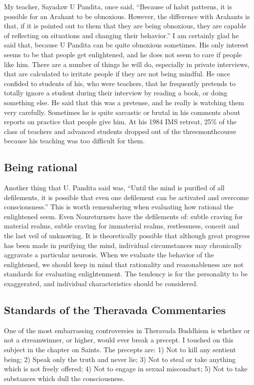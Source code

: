 \documentclass[a5paper,10pt,english]{book}
\begin{document}
\sphinxAtStartPar
My teacher, Sayadaw U Pandita, once said, “Because of habit patterns, it
is possible for an Arahant to be obnoxious. However, the difference with
Arahants is that, if it is pointed out to them that they are being
obnoxious, they are capable of reflecting on situations and changing
their behavior.” I am certainly glad he said that, because U Pandita can
be quite obnoxious sometimes. His only interest seems to be that people
get enlightened, and he does not seem to care if people like him. There
are a number of things he will do, especially in private interviews,
that are calculated to irritate people if they are not being mindful. He
once confided to students of his, who were teachers, that he frequently
pretends to totally ignore a student during their interview by reading a
book, or doing something else. He said that this was a pretense, and he
really is watching them very carefully. Sometimes he is quite sarcastic
or brutal in his comments about reports on practice that people give
him. At his 1984 IMS retreat, 25\% of the class of teachers and advanced
students dropped out of the three\sphinxhyphen{}month\sphinxhyphen{}course because his teaching was
too difficult for them.


\subsection{Being rational}
\label{\detokenize{saints:being-rational}}
\sphinxAtStartPar
Another thing that U. Pandita said was, “Until the mind is purified of
all defilements, it is possible that even one defilement can be
activated and overcome consciousness.” This is worth remembering when
evaluating how rational the enlightened seem. Even Non\sphinxhyphen{}returners have
the defilements of: subtle craving for material realms, subtle craving
for immaterial realms, restlessness, conceit and the last veil of
unknowing. It is theoretically possible that although great progress has
been made in purifying the mind, individual circumstances may
chronically aggravate a particular neurosis. When we evaluate the
behavior of the enlightened, we should keep in mind that rationality and
reasonableness are not standards for evaluating enlightenment. The
tendency is for the personality to be exaggerated, and individual
characteristics should be considered.


\subsection{Standards of the Theravada Commentaries}
\label{\detokenize{saints:standards-of-the-theravada-commentaries}}
\sphinxAtStartPar
One of the most embarrassing controversies in Theravada Buddhism is
whether or not a stream\sphinxhyphen{}winner, or higher, would ever break a precept. I
touched on this subject in the chapter on Saints. The precepts are: 1)
Not to kill any sentient being; 2) Speak only the truth and never lie;
3) Not to steal or take anything which is not freely offered; 4) Not to
engage in sexual misconduct; 5) Not to take substances which dull the
consciousness.
\end{document}

